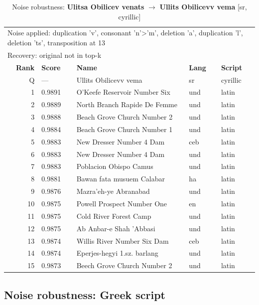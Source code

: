 \begin{table}[htbp]
\centering
\small
\caption{Noise robustness: \textbf{Ulitsa Obilicev venats} $\rightarrow$ \textbf{Ullits Obilicevv vema} [sr, cyrillic]}
\label{tab:noise-20}
\begin{tabular}{rllll}
\toprule
\multicolumn{5}{l}{\small Noise applied: duplication 'v', consonant 'n'>'m', deletion 'a', duplication 'l', deletion 'ts', transposition at 13} \\
\multicolumn{5}{l}{\small Recovery: original not in top-k} \\
\midrule
\textbf{Rank} & \textbf{Score} & \textbf{Name} & \textbf{Lang} & \textbf{Script} \\
\midrule
\rowcolor{gray!20} Q & --- & Ullits Obilicevv vema & sr & cyrillic \\
\midrule
1 & 0.9891 & O'Keefe Reservoir Number Six & und & latin \\
2 & 0.9889 & North Branch Rapide De Femme & und & latin \\
3 & 0.9888 & Beach Grove Church Number 2 & und & latin \\
4 & 0.9884 & Beach Grove Church Number 1 & und & latin \\
5 & 0.9883 & New Dresser Number 4 Dam & ceb & latin \\
6 & 0.9883 & New Dresser Number 4 Dam & und & latin \\
7 & 0.9883 & Poblacion Obispo Camus & und & latin \\
8 & 0.9881 & Bawan fata musuem Calabar & ha & latin \\
9 & 0.9876 & Mazra'eh-ye Abranabad & und & latin \\
10 & 0.9875 & Powell Prospect Number One & en & latin \\
11 & 0.9875 & Cold River Forest Camp & und & latin \\
12 & 0.9875 & Ab Anbar-e Shah 'Abbasi & und & latin \\
13 & 0.9874 & Willis River Number Six Dam & ceb & latin \\
14 & 0.9874 & Eperjes-hegyi 1.sz. barlang & und & latin \\
15 & 0.9873 & Beech Grove Church Number 2 & und & latin \\
\bottomrule
\end{tabular}
\end{table}

\subsection*{Noise robustness: Greek script}

